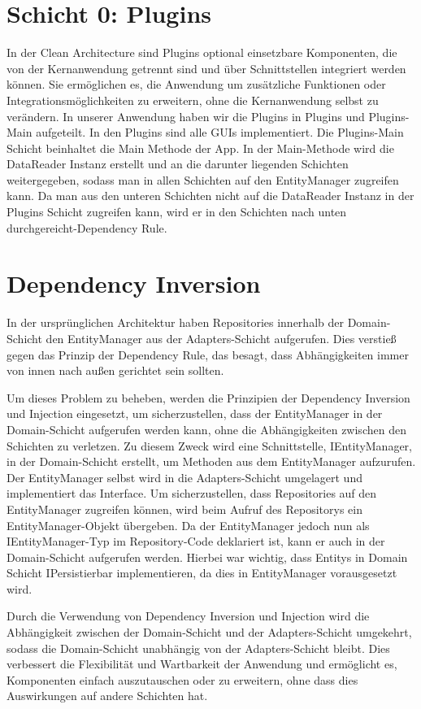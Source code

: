 \section{Schicht 0: Plugins}
In der Clean Architecture sind Plugins optional einsetzbare Komponenten, die von der Kernanwendung getrennt sind und über Schnittstellen integriert werden können. Sie ermöglichen es, die Anwendung um zusätzliche Funktionen oder Integrationsmöglichkeiten zu erweitern, ohne die Kernanwendung selbst zu verändern. In unserer Anwendung haben wir die Plugins in Plugins und Plugins-Main aufgeteilt.
In den Plugins sind alle GUIs implementiert.
Die Plugins-Main Schicht beinhaltet die Main Methode der App. In der Main-Methode wird die DataReader Instanz erstellt und an die darunter liegenden Schichten weitergegeben, sodass man in allen Schichten auf den EntityManager zugreifen kann. Da man aus den unteren Schichten nicht auf die DataReader Instanz in der Plugins Schicht zugreifen kann, wird er in den Schichten nach unten durchgereicht-Dependency Rule.

\section{Dependency Inversion}
In der ursprünglichen Architektur haben Repositories innerhalb der Domain-Schicht den EntityManager aus der Adapters-Schicht aufgerufen. Dies verstieß gegen das Prinzip der Dependency Rule, das besagt, dass Abhängigkeiten immer von innen nach außen gerichtet sein sollten.

Um dieses Problem zu beheben, werden die Prinzipien der Dependency Inversion und Injection eingesetzt, um sicherzustellen, dass der EntityManager in der Domain-Schicht aufgerufen werden kann, ohne die Abhängigkeiten zwischen den Schichten zu verletzen.
Zu diesem Zweck wird eine Schnittstelle, IEntityManager, in der Domain-Schicht erstellt, um Methoden aus dem EntityManager aufzurufen. Der EntityManager selbst wird in die Adapters-Schicht umgelagert und implementiert das Interface. Um sicherzustellen, dass Repositories auf den EntityManager zugreifen können, wird beim Aufruf des Repositorys ein EntityManager-Objekt übergeben. Da der EntityManager jedoch nun als IEntityManager-Typ im Repository-Code deklariert ist, kann er auch in der Domain-Schicht aufgerufen werden. Hierbei war wichtig, dass Entitys in Domain Schicht IPersistierbar implementieren, da dies in EntityManager vorausgesetzt wird. 

Durch die Verwendung von Dependency Inversion und Injection wird die Abhängigkeit zwischen der Domain-Schicht und der Adapters-Schicht umgekehrt, sodass die Domain-Schicht unabhängig von der Adapters-Schicht bleibt. Dies verbessert die Flexibilität und Wartbarkeit der Anwendung und ermöglicht es, Komponenten einfach auszutauschen oder zu erweitern, ohne dass dies Auswirkungen auf andere Schichten hat.


